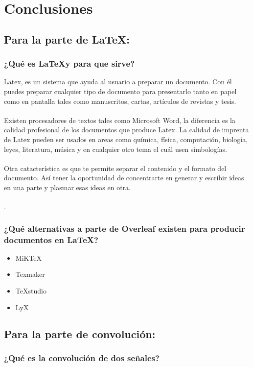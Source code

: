 \documentclass[10pt]{article}
\begin{document}
\section{Conclusiones}
\subsection{Para la parte de \LaTeX:}
\subsubsection{¿Qué es \LaTeX y para que sirve?}

Latex, es un sistema que ayuda al usuario a preparar un documento. Con él puedes preparar cualquier tipo de documento para presentarlo tanto en papel como en pantalla tales como manuscritos, cartas, artículos de revistas y tesis.\\ \\
Existen procesadores de textos tales como Microsoft Word, la diferencia es la calidad profesional de los documentos que produce Latex. La calidad de imprenta de Latex pueden ser usados en areas como química, física, computación, biología, leyes, literatura, música y en cualquier otro tema el cuál usen simbologías.\\ \\
Otra catacterística es que te permite separar el contenido y el formato del documento. Así tener la oportunidad de concentrarte en generar y escribir ideas en una parte y plasmar esas ideas en otra.\\ \\\cite{IEEEreferencias:Ref3}.

\subsubsection{¿Qué alternativas a parte de Overleaf existen para producir documentos en \LaTeX?}
\begin{itemize}
    \item MiKTeX
    \item Texmaker
    \item TeXstudio
    \item LyX
\end{itemize}


\subsection{Para la parte de convolución:}

\subsubsection{¿Qué es la convolución de dos señales?}
\end{document}

